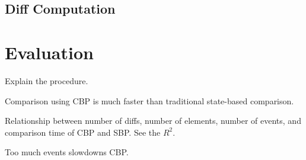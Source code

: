 \documentclass{llncs}
\begin{document}
\subsection{Diff Computation}
\label{sec:diff_computation}

\section{Evaluation}
\label{sec:evaluation}

Explain the procedure.

Comparison using CBP is much faster than traditional state-based comparison.

Relationship between number of diffs, number of elements, number of events, and comparison time of CBP and SBP. See the $R^2$.

Too much events slowdowns CBP.
 
\end{document}
